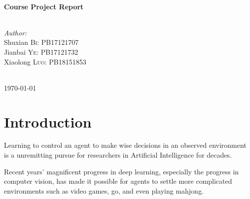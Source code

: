 \documentclass[12pt]{article}
\begin{document}
\begin{titlepage}
\HRule \\[0.4cm]
{ \huge \bfseries Course Project Report}\\[0.4cm] %
\HRule \\[1.5cm]
 

\begin{minipage}{0.4\textwidth}
\begin{flushleft} 
\large\emph{Author:}\\
\large Shuxian \textsc{Bi}: PB17121707\\
Jianbai \textsc{Ye}: PB17121732\\
Xiaolong \textsc{Luo}: PB18151853\\
\end{flushleft}

\end{minipage}\\[2cm]



{\large \today}\\[2cm] %

\vfill %

\end{titlepage}

\tableofcontents

\newpage

\section{Introduction}
Learning to control an agent to make wise decisions in an observed environment is a unremitting pursue for researchers in Artificial Intelligence for decades.

Recent years' magnificent progress in deep learning, especially the progress in computer vision, has made it possible for agents to settle more complicated environments such as video games\cite{DBLP:journals/corr/MnihKSGAWR13}, go\cite{DBLP:journals/nature/SilverHMGSDSAPL16}, and even playing mahjong\cite{DBLP:journals/corr/abs-2003-13590}. 
\end{document}
